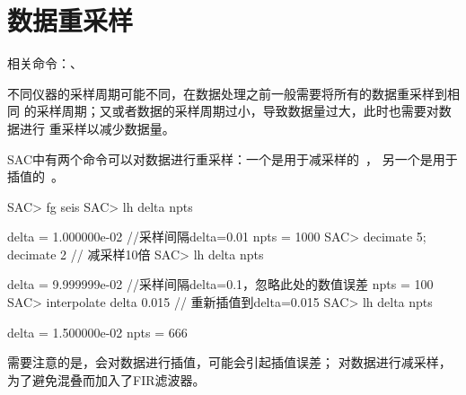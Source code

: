 \section{数据重采样}
相关命令：、

不同仪器的采样周期可能不同，在数据处理之前一般需要将所有的数据重采样到相同
的采样周期；又或者数据的采样周期过小，导致数据量过大，此时也需要对数据进行
重采样以减少数据量。

SAC中有两个命令可以对数据进行重采样：一个是用于减采样的~，
另一个是用于插值的~。

\begin{SACCode}
SAC> fg seis
SAC> lh delta npts

     delta = 1.000000e-02       //采样间隔delta=0.01
      npts = 1000
SAC> decimate 5; decimate 2     // 减采样10倍
SAC> lh delta npts

     delta = 9.999999e-02       //采样间隔delta=0.1，忽略此处的数值误差
      npts = 100
SAC> interpolate delta 0.015    // 重新插值到delta=0.015
SAC> lh delta npts

     delta = 1.500000e-02
      npts = 666
\end{SACCode}

需要注意的是，会对数据进行插值，可能会引起插值误差；
对数据进行减采样，为了避免混叠而加入了FIR滤波器。
